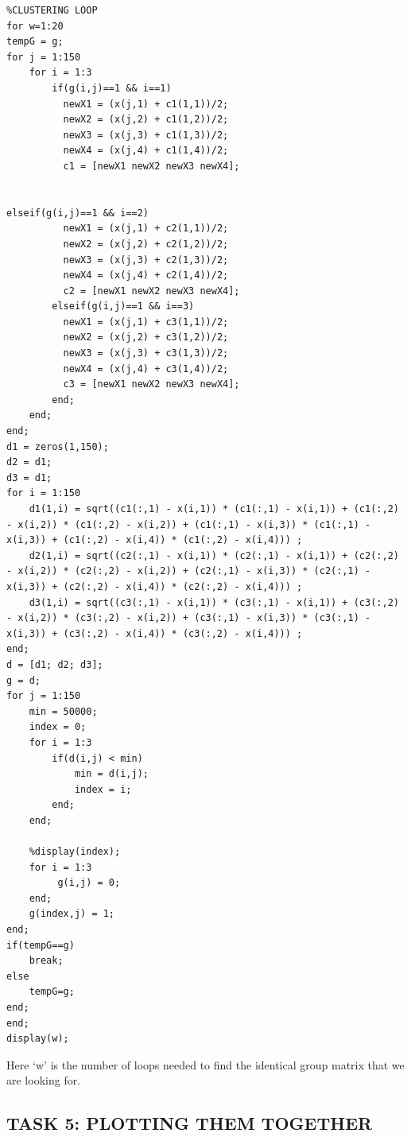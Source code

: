 \documentclass[conference]{IEEEtran}
\begin{document}
\begin{lstlisting}
%CLUSTERING LOOP
for w=1:20 
tempG = g;
for j = 1:150
    for i = 1:3
        if(g(i,j)==1 && i==1)
          newX1 = (x(j,1) + c1(1,1))/2;
          newX2 = (x(j,2) + c1(1,2))/2;
          newX3 = (x(j,3) + c1(1,3))/2;
          newX4 = (x(j,4) + c1(1,4))/2;
          c1 = [newX1 newX2 newX3 newX4];


elseif(g(i,j)==1 && i==2)
          newX1 = (x(j,1) + c2(1,1))/2;
          newX2 = (x(j,2) + c2(1,2))/2;
          newX3 = (x(j,3) + c2(1,3))/2;
          newX4 = (x(j,4) + c2(1,4))/2;
          c2 = [newX1 newX2 newX3 newX4];
        elseif(g(i,j)==1 && i==3)
          newX1 = (x(j,1) + c3(1,1))/2;
          newX2 = (x(j,2) + c3(1,2))/2;
          newX3 = (x(j,3) + c3(1,3))/2;
          newX4 = (x(j,4) + c3(1,4))/2;
          c3 = [newX1 newX2 newX3 newX4];
        end;
    end;
end;
d1 = zeros(1,150);
d2 = d1;
d3 = d1;
for i = 1:150
    d1(1,i) = sqrt((c1(:,1) - x(i,1)) * (c1(:,1) - x(i,1)) + (c1(:,2) - x(i,2)) * (c1(:,2) - x(i,2)) + (c1(:,1) - x(i,3)) * (c1(:,1) - x(i,3)) + (c1(:,2) - x(i,4)) * (c1(:,2) - x(i,4))) ;
    d2(1,i) = sqrt((c2(:,1) - x(i,1)) * (c2(:,1) - x(i,1)) + (c2(:,2) - x(i,2)) * (c2(:,2) - x(i,2)) + (c2(:,1) - x(i,3)) * (c2(:,1) - x(i,3)) + (c2(:,2) - x(i,4)) * (c2(:,2) - x(i,4))) ;
    d3(1,i) = sqrt((c3(:,1) - x(i,1)) * (c3(:,1) - x(i,1)) + (c3(:,2) - x(i,2)) * (c3(:,2) - x(i,2)) + (c3(:,1) - x(i,3)) * (c3(:,1) - x(i,3)) + (c3(:,2) - x(i,4)) * (c3(:,2) - x(i,4))) ;
end;
d = [d1; d2; d3];
g = d;
for j = 1:150
    min = 50000;
    index = 0;
    for i = 1:3
        if(d(i,j) < min)
            min = d(i,j);
            index = i;
        end;
    end;
 
    %display(index);
    for i = 1:3
         g(i,j) = 0;
    end;
    g(index,j) = 1;
end;
if(tempG==g)
    break;
else 
    tempG=g;
end;
end;
display(w);
\end{lstlisting}
Here ‘w’ is the number of loops needed to find the identical group matrix that we are looking for.\\

\subsection{TASK 5: PLOTTING THEM TOGETHER}
\end{document}
